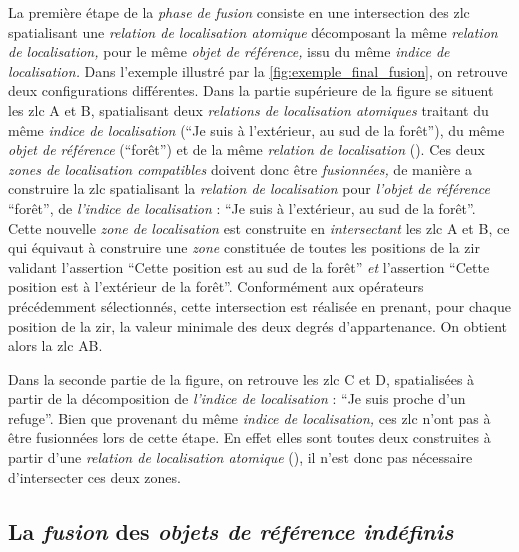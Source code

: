 La première étape de la \emph{phase de fusion} consiste en une
intersection des \ac{zlc} spatialisant une \emph{relation de
  localisation atomique} décomposant la même \emph{relation de
  localisation,} pour le même \emph{objet de référence,} issu du même
\emph{indice de localisation.} Dans l'exemple illustré par la
\autoref{fig:exemple_final_fusion}, on retrouve deux configurations
différentes. Dans la partie supérieure de la figure se situent les
\ac{zlc} \textcolor{RdBu-9-1}{\textsf{A}} et
\textcolor{RdBu-9-2}{\textsf{B}}, spatialisant deux \emph{relations de
  localisation atomiques} traitant du même \emph{indice de
  localisation} (\enquote{Je suis à l'extérieur, au sud de la forêt}),
du même \emph{objet de référence} (\enquote{forêt}) et de la même
\emph{relation de localisation}
(). Ces deux \emph{zones de
  localisation compatibles} doivent donc être \emph{fusionnées,} de
manière a construire la \ac{zlc} spatialisant la \emph{relation de
  localisation}  pour
\emph{l'objet de référence} \enquote{forêt}, de \emph{l'indice de
  localisation} : \enquote{Je suis à l'extérieur, au sud de la
  forêt}. Cette nouvelle \emph{zone de localisation} est construite en
\emph{intersectant} les \ac{zlc} \textcolor{RdBu-9-1}{\textsf{A}} et
\textcolor{RdBu-9-2}{\textsf{B}}, ce qui équivaut à construire une
\emph{zone} constituée de toutes les positions de la \ac{zir} validant
l'assertion \enquote{Cette position est au sud de la forêt} \emph{et}
l'assertion \enquote{Cette position est à l'extérieur de la
  forêt}. Conformément aux opérateurs précédemment sélectionnés, cette
intersection est réalisée en prenant, pour chaque position de la
\ac{zir}, la valeur minimale des deux degrés d'appartenance. On
obtient alors la \ac{zlc} \textcolor{RdBu-9-1}{\textsf{AB}}.

Dans la seconde partie de la figure, on retrouve les \ac{zlc}
\textcolor{RdBu-9-8}{\textsf{C}} et \textcolor{RdBu-9-9}{\textsf{D}},
spatialisées à partir de la décomposition de \emph{l'indice de
  localisation} : \enquote{Je suis proche d'un refuge}. Bien que
provenant du même \emph{indice de localisation,} ces \ac{zlc} n'ont
pas à être fusionnées lors de cette étape. En effet elles sont toutes
deux construites à partir d'une \emph{relation de localisation
  atomique} (), il n'est donc pas nécessaire
d'intersecter ces deux zones.

\subsection{La \emph{fusion} des \emph{objets de référence indéfinis}}

